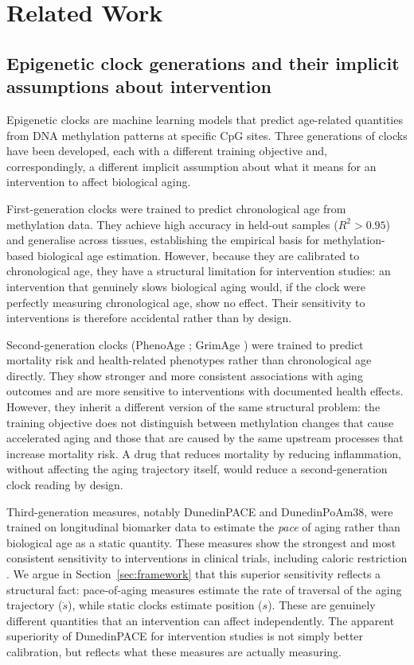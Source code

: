 \section{Related Work}
\label{sec:related}

\subsection{Epigenetic clock generations and their implicit assumptions about intervention}

Epigenetic clocks are machine learning models that predict age-related quantities
from DNA methylation patterns at specific CpG sites. Three generations of clocks
have been developed, each with a different training objective and, correspondingly,
a different implicit assumption about what it means for an intervention to affect
biological aging.

First-generation clocks \cite{horvath2013,hannum2013} were trained to predict
chronological age from methylation data. They achieve high accuracy in held-out
samples ($R^2 > 0.95$) and generalise across tissues, establishing the empirical
basis for methylation-based biological age estimation. However, because they are
calibrated to chronological age, they have a structural limitation for intervention
studies: an intervention that genuinely slows biological aging would, if the clock
were perfectly measuring chronological age, show no effect. Their sensitivity to
interventions is therefore accidental rather than by design.

Second-generation clocks (PhenoAge \cite{levine2018}; GrimAge \cite{lu2019}) were
trained to predict mortality risk and health-related phenotypes rather than
chronological age directly. They show stronger and more consistent associations with
aging outcomes and are more sensitive to interventions with documented health effects.
However, they inherit a different version of the same structural problem: the training
objective does not distinguish between methylation changes that cause accelerated aging
and those that are caused by the same upstream processes that increase mortality risk.
A drug that reduces mortality by reducing inflammation, without affecting the aging
trajectory itself, would reduce a second-generation clock reading by design.

Third-generation measures, notably DunedinPACE \cite{belsky2022} and DunedinPoAm38,
were trained on longitudinal biomarker data to estimate the \emph{pace} of aging
rather than biological age as a static quantity. These measures show the strongest
and most consistent sensitivity to interventions in clinical trials, including caloric
restriction \cite{belsky2023calerie}. We argue in Section~\ref{sec:framework} that
this superior sensitivity reflects a structural fact: pace-of-aging measures estimate
the rate of traversal of the aging trajectory ($\dot{s}$), while static clocks
estimate position ($s$). These are genuinely different quantities that an intervention
can affect independently. The apparent superiority of DunedinPACE for intervention
studies is not simply better calibration, but reflects what these measures are
actually measuring.

